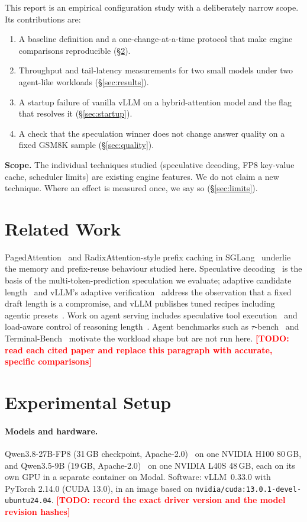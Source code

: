 \documentclass[11pt]{article}
\newcommand{\todo}[1]{\textcolor{red}{\textbf{[TODO: #1]}}}
\begin{document}
This report is an empirical configuration study with a deliberately narrow scope. Its contributions are:
\begin{enumerate}
  \item A baseline definition and a one-change-at-a-time protocol that make engine comparisons reproducible (\S\ref{sec:setup}).
  \item Throughput and tail-latency measurements for two small models under two agent-like workloads (\S\ref{sec:results}).
  \item A startup failure of vanilla vLLM on a hybrid-attention model and the flag that resolves it (\S\ref{sec:startup}).
  \item A check that the speculation winner does not change answer quality on a fixed GSM8K sample (\S\ref{sec:quality}).
\end{enumerate}
\label{sec:scope}
\textbf{Scope.} The individual techniques studied (speculative decoding, FP8 key-value cache, scheduler limits) are existing engine
features. We do not claim a new technique. Where an effect is measured once, we say so (\S\ref{sec:limits}).

\section{Related Work}
PagedAttention~\cite{kwon2023pagedattention} and RadixAttention-style prefix caching in SGLang~\cite{zheng2023sglang} underlie the memory and
prefix-reuse behaviour studied here. Speculative decoding~\cite{leviathan2023speculative} is the basis of the multi-token-prediction speculation we
evaluate; adaptive candidate length~\cite{specdecpp} and vLLM's adaptive verification~\cite{vllm_adaptive_verification} address
the observation that a fixed draft length is a compromise, and vLLM publishes tuned recipes including agentic presets~\cite{vllm_recipes}.
Work on agent serving includes speculative tool execution~\cite{paste2026} and load-aware control of reasoning length~\cite{laser2026}.
Agent benchmarks such as $\tau$-bench~\cite{yao2024taubench} and Terminal-Bench~\cite{terminalbench} motivate the workload shape but are not run here.
\todo{read each cited paper and replace this paragraph with accurate, specific comparisons}

\section{Experimental Setup}\label{sec:setup}
\paragraph{Models and hardware.} Qwen3.8-27B-FP8 (31\,GB checkpoint, Apache-2.0)~\cite{qwen38_card} on one NVIDIA H100 80\,GB, and
Qwen3.5-9B (19\,GB, Apache-2.0)~\cite{qwen35_card} on one NVIDIA L40S 48\,GB, each on its own GPU in a separate container on Modal.
Software: vLLM~0.33.0 with PyTorch 2.14.0 (CUDA 13.0), in an image based on \texttt{nvidia/cuda:13.0.1-devel-ubuntu24.04}.
\todo{record the exact driver version and the model revision hashes}
\end{document}
